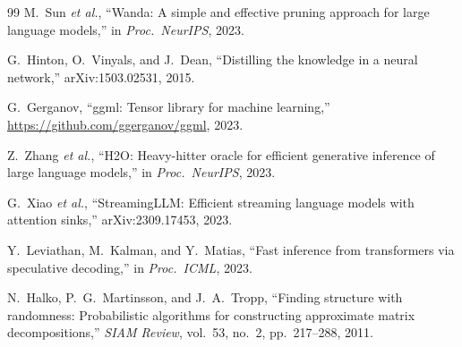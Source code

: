 \documentclass[11pt,a4paper,twocolumn]{article}
\begin{document}
\begin{thebibliography}{99}
	M.~Sun \emph{et al.}, ``Wanda: A simple and effective pruning approach for
	large language models,''
	in \emph{Proc.\ NeurIPS}, 2023.

	G.~Hinton, O.~Vinyals, and J.~Dean, ``Distilling the knowledge in a neural
	network,''
	arXiv:1503.02531, 2015.

	G.~Gerganov, ``ggml: Tensor library for machine learning,''
	\url{https://github.com/ggerganov/ggml}, 2023.

	Z.~Zhang \emph{et al.}, ``H2O: Heavy-hitter oracle for efficient generative
	inference of large language models,''
	in \emph{Proc.\ NeurIPS}, 2023.

	G.~Xiao \emph{et al.}, ``StreamingLLM: Efficient streaming language models
	with attention sinks,''
	arXiv:2309.17453, 2023.

	Y.~Leviathan, M.~Kalman, and Y.~Matias, ``Fast inference from transformers
	via speculative decoding,''
	in \emph{Proc.\ ICML}, 2023.

	N.~Halko, P.~G.~Martinsson, and J.~A.~Tropp, ``Finding structure with
	randomness: Probabilistic algorithms for constructing approximate matrix
	decompositions,''
	\emph{SIAM Review}, vol.~53, no.~2, pp.~217--288, 2011.

\end{thebibliography}
\end{document}
